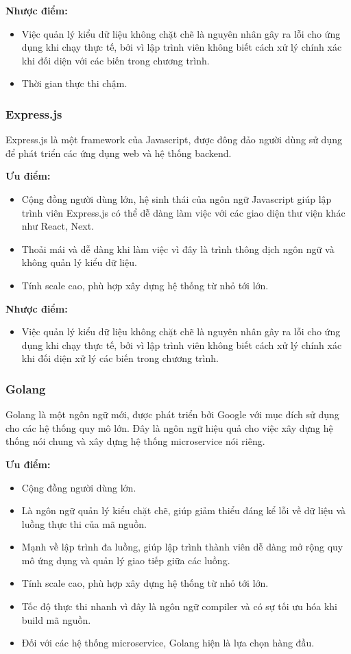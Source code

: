 \textbf{Nhược điểm:}
\begin{itemize}
    \item Việc quản lý kiểu dữ liệu không chặt chẽ là nguyên nhân gây ra lỗi cho ứng dụng khi chạy thực tế, bởi vì lập trình viên không biết cách xử lý chính xác khi đối diện với các biến trong chương trình.
    \item Thời gian thực thi chậm.
\end{itemize}


\subsubsection{Express.js}
Express.js là một framework của Javascript, được đông đảo người dùng sử dụng để phát triển các ứng dụng web và hệ thống backend.

\textbf{Ưu điểm:}
\begin{itemize}
    \item Cộng đồng người dùng lớn, hệ sinh thái của ngôn ngữ Javascript giúp lập trình viên Express.js có thể dễ dàng làm việc với các giao diện thư viện khác như React, Next.
    \item Thoải mái và dễ dàng khi làm việc vì đây là trình thông dịch ngôn ngữ và không quản lý kiểu dữ liệu.
    \item Tính scale cao, phù hợp xây dựng hệ thống từ nhỏ tới lớn.
\end{itemize}

\textbf{Nhược điểm:}
\begin{itemize}
    \item Việc quản lý kiểu dữ liệu không chặt chẽ là nguyên nhân gây ra lỗi cho ứng dụng khi chạy thực tế, bởi vì lập trình viên không biết cách xử lý chính xác khi đối diện xử lý các biến trong chương trình.
\end{itemize}

\subsubsection{Golang}
Golang là một ngôn ngữ mới, được phát triển bởi Google với mục đích sử dụng cho các hệ thống quy mô lớn. Đây là ngôn ngữ hiệu quả cho việc xây dựng hệ thống nói chung và xây dựng hệ thống microservice nói riêng.

\textbf{Ưu điểm:}
\begin{itemize}
    \item Cộng đồng người dùng lớn.
    \item Là ngôn ngữ quản lý kiểu chặt chẽ, giúp giảm thiểu đáng kể lỗi về dữ liệu và luồng thực thi của mã nguồn.
    \item Mạnh về lập trình đa luồng, giúp lập trình thành viên dễ dàng mở rộng quy mô ứng dụng và quản lý giao tiếp giữa các luồng.
    \item Tính scale cao, phù hợp xây dựng hệ thống từ nhỏ tới lớn.
    \item Tốc độ thực thi nhanh vì đây là ngôn ngữ compiler và có sự tối ưu hóa khi build mã nguồn.
    \item Đối với các hệ thống microservice, Golang hiện là lựa chọn hàng đầu.
\end{itemize}

